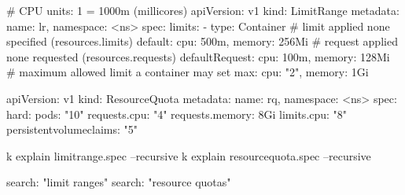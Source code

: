 \begin{tcbitemize}[
  raster columns=4, raster equal height=rows,
  blanker, cheat subtitle
]
\begin{tcbitemize}[
      raster columns=1, raster equal height=rows,
      blanker, cheat subtitle
    ]
    \end{tcbitemize}

  \tcbitem
    \begin{tcbitemize}[
      raster columns=1, raster equal height=rows,
      blanker, cheat subtitle
    ]

      \tcbitem
        \begin{cheatcodebash}
        # CPU units: 1 = 1000m (millicores)
        apiVersion: v1
        kind: LimitRange
        metadata: {name: lr, namespace: <ns>}
        spec:
          limits:
          - type: Container
            # limit applied none specified (resources.limits)
            default:        {cpu: 500m, memory: 256Mi}
            # request applied none requested (resources.requests)
            defaultRequest: {cpu: 100m, memory: 128Mi}
            # maximum allowed limit a container may set
            max:            {cpu: "2",  memory: 1Gi}
        \end{cheatcodebash}

        \begin{cheatcodebash}
        apiVersion: v1
        kind: ResourceQuota
        metadata: {name: rq, namespace: <ns>}
        spec:
          hard:
            pods: "10"
            requests.cpu: "4"
            requests.memory: 8Gi
            limits.cpu: "8"
            persistentvolumeclaims: "5"
        \end{cheatcodebash}

        \begin{cheatcodebash}
        k explain limitrange.spec --recursive
        k explain resourcequota.spec --recursive
        \end{cheatcodebash}

        \begin{cheatcodebash}
        search: "limit ranges"
        search: "resource quotas"
        \end{cheatcodebash}


\end{tcbitemize}
\end{tcbitemize}
